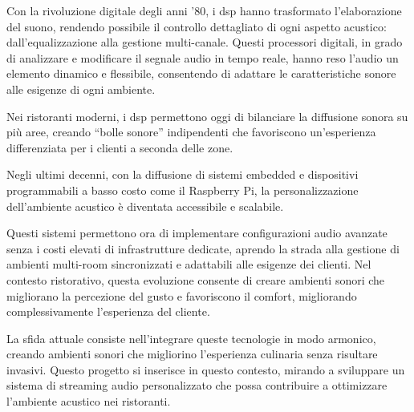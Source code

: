 Con la rivoluzione digitale degli anni ’80, i \gls{dsp} hanno trasformato l’elaborazione del suono, rendendo possibile il controllo dettagliato di ogni aspetto acustico: dall’equalizzazione alla gestione multi-canale. Questi processori digitali, in grado di analizzare e modificare il segnale audio in tempo reale, hanno reso l’audio un elemento dinamico e flessibile, consentendo di adattare le caratteristiche sonore alle esigenze di ogni ambiente. 

Nei ristoranti moderni, i \gls{dsp} permettono oggi di bilanciare la diffusione sonora su più aree, creando “bolle sonore” indipendenti che favoriscono un’esperienza differenziata per i clienti a seconda delle zone.

Negli ultimi decenni, con la diffusione di sistemi embedded e dispositivi programmabili a basso costo come il Raspberry Pi, la personalizzazione dell’ambiente acustico è diventata accessibile e scalabile.

Questi sistemi permettono ora di implementare configurazioni audio avanzate senza i costi elevati di infrastrutture dedicate, aprendo la strada alla gestione di ambienti multi-room sincronizzati e adattabili alle esigenze dei clienti. Nel contesto ristorativo, questa evoluzione consente di creare ambienti sonori che migliorano la percezione del gusto e favoriscono il comfort, migliorando complessivamente l’esperienza del cliente.

La sfida attuale consiste nell'integrare queste tecnologie in modo armonico, creando ambienti sonori che migliorino l'esperienza culinaria senza risultare invasivi. Questo progetto si inserisce in questo contesto, mirando a sviluppare un sistema di streaming audio personalizzato che possa contribuire a ottimizzare l'ambiente acustico nei ristoranti.

